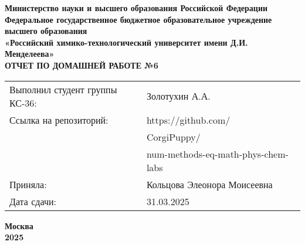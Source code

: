 \documentclass[12pt, a4paper]{report}
\begin{document}
	\begin{titlepage}
		\begin{center}
			\large \textbf{Министерство науки и высшего образования Российской Федерации} \\
			\large \textbf{Федеральное государственное бюджетное образовательное учреждение высшего образования} \\
			\large \textbf{«Российский химико-технологический университет имени Д.И. Менделеева»} \\

			\vspace*{4cm}
			\LARGE \textbf{ОТЧЕТ ПО ДОМАШНЕЙ РАБОТЕ №6}

			\vspace*{4cm}
			\begin{flushright}
				\Large
				\begin{tabular}{>{\raggedleft\arraybackslash}p{9cm} p{10cm}}
					Выполнил студент группы КС-36: & Золотухин А.А. \\
					Ссылка на репозиторий: & https://github.com/ \\
					& CorgiPuppy/ \\
					& num-methods-eq-math-phys-chem-labs \\
					Приняла: & Кольцова Элеонора Моисеевна \\
					Дата сдачи: & 31.03.2025 \\
				\end{tabular}
			\end{flushright}

			\vspace*{6cm}
			\Large \textbf{Москва \\ 2025}
		\end{center}
	\end{titlepage}

	\tableofcontents
	\thispagestyle{empty}
	\newpage

\end{document}
